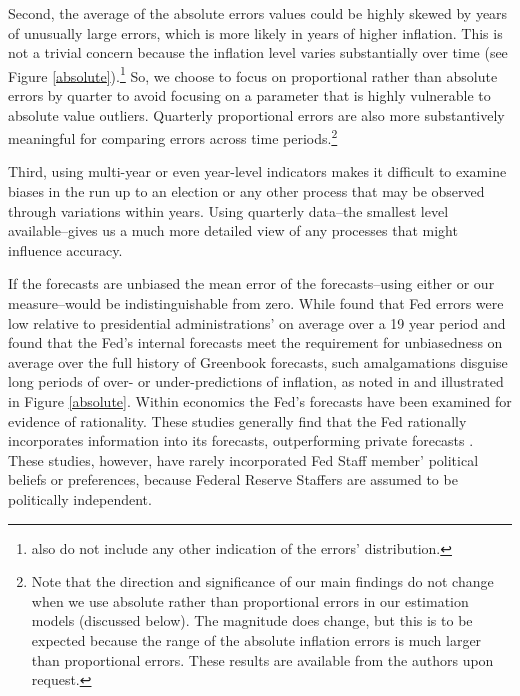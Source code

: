 \documentclass[a4paper]{article}\usepackage[]{graphicx}\usepackage[]{color}
\begin{document}
Second, the average of the absolute errors values could be highly skewed by years of unusually large errors, which is more likely in years of higher inflation. This is not a trivial concern because the inflation level varies substantially over time (see Figure \ref{absolute}).\footnote{\cite{Frendreis2000} also do not include any other indication of the errors' distribution.} So, we choose to focus on proportional rather than absolute errors by quarter to avoid focusing on a parameter that is highly vulnerable to absolute value outliers. Quarterly proportional errors are also more substantively meaningful for comparing errors across time periods.\footnote{Note that the direction and significance of our main findings do not change when we use absolute rather than proportional errors in our estimation models (discussed below). The magnitude does change, but this is to be expected because the range of the absolute inflation errors is much larger than proportional errors. These results are available from the authors upon request.} 

Third, using multi-year or even year-level indicators makes it difficult to examine biases in the run up to an election or any other process that may be observed through variations within years. Using quarterly data--the smallest level available--gives us a much more detailed view of any processes that might influence accuracy.

If the forecasts are unbiased the mean error of the forecasts--using either \cite{Frendreis2000} or our measure--would be indistinguishable from zero. While \cite{Frendreis2000} found that Fed errors were low relative to presidential administrations' on average over a 19 year period and \cite{Romer2000} found that the Fed's internal forecasts meet the requirement for unbiasedness on average over the full history of Greenbook forecasts, such amalgamations disguise long periods of over- or under-predictions of inflation, as noted in \cite{Capistran2006} and illustrated in Figure \ref{absolute}. Within economics the Fed's forecasts have been examined for evidence of rationality. These studies generally find that the Fed rationally incorporates information into its forecasts, outperforming private forecasts \cite[c.f.][]{Gamber2009}. These studies, however, have rarely incorporated Fed Staff member' political beliefs or preferences, because Federal Reserve Staffers are assumed to be politically independent.
\end{document}
